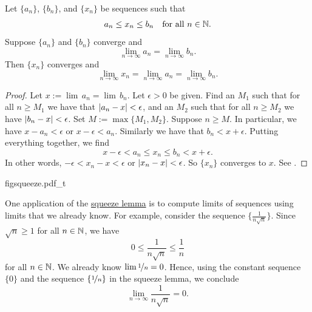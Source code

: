 \begin{lemma} \label{squeeze:lemma}
Let $\{ a_n \}$, 
$\{ b_n \}$, and 
$\{ x_n \}$ be sequences such that
\begin{equation*}
a_n \leq x_n \leq b_n \quad \text{for all } n \in {\mathbb{N}}.
\end{equation*}
Suppose $\{ a_n \}$ and $\{ b_n \}$ converge and
\begin{equation*}
\lim_{n\to \infty} a_n
=
\lim_{n\to \infty} b_n .
\end{equation*}
Then $\{ x_n \}$ converges and
\begin{equation*}
\lim_{n\to \infty} x_n
=
\lim_{n\to \infty} a_n
=
\lim_{n\to \infty} b_n .
\end{equation*}
\end{lemma}

\begin{proof}
Let $x := \lim\, a_n = \lim\, b_n$.
Let $\epsilon > 0$ be given.
Find an $M_1$ such that for all $n \geq M_1$ we have
that $\left\lvert {a_n-x} \right\rvert < \epsilon$, and an $M_2$
such that for all $n \geq M_2$
we have $\left\lvert {b_n-x} \right\rvert < \epsilon$.  Set $M := \max \{M_1, M_2 \}$.
Suppose $n \geq M$.
In particular, we have
$x - a_n < \epsilon$ or 
$x - \epsilon < a_n$.  Similarly we have that $b_n < x + \epsilon$.
Putting everything together, we find
\begin{equation*}
x - \epsilon < a_n \leq x_n \leq b_n < x + \epsilon .
\end{equation*}
In other words, $-\epsilon < x_n-x < \epsilon$ or $\left\lvert {x_n-x} \right\rvert < \epsilon$.
So $\{x_n\}$ converges to $x$.
See .
\end{proof}

\begin{myfigureht}
{figsqueeze.pdf_t}
\caption{Squeeze lemma proof in picture.\label{figsqueeze}}
\end{myfigureht}

\begin{example}
One application of
the \hyperref[squeeze:lemma]{squeeze lemma} is to compute limits of 
sequences using limits that we already know.  For example, consider
the sequence $\{ \frac{1}{n\sqrt{n}} \}$.
Since $\sqrt{n} \geq 1$ for all $n \in {\mathbb{N}}$, we have
\begin{equation*}
0 \leq \frac{1}{n\sqrt{n}} \leq \frac{1}{n}
\end{equation*}
for all $n \in {\mathbb{N}}$.  We already know $\lim \nicefrac{1}{n} = 0$. 
Hence, using
the constant sequence $\{ 0 \}$ and the sequence $\{ \nicefrac{1}{n} \}$ in the
squeeze lemma, we conclude
\begin{equation*}
\lim_{n\to\infty} \frac{1}{n\sqrt{n}} = 0 .
\end{equation*}
\end{example}

